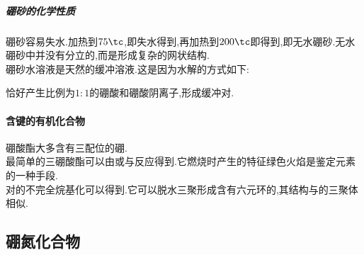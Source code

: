 \documentclass{ctexart}
\begin{document}
\subparagraph{硼砂的化学性质}
硼砂容易失水.加热到$75\tc$,即失水得到,再加热到$200\tc$即得到,即无水硼砂.无水硼砂中并没有分立的,而是形成复杂的网状结构.\\
\indent 硼砂水溶液是天然的缓冲溶液.这是因为水解的方式如下:
\begin{center}
\end{center}
恰好产生比例为$1:1$的硼酸和硼酸阴离子,形成缓冲对.
\paragraph{含键的有机化合物}
硼酸酯大多含有三配位的硼.\\
\indent 最简单的三硼酸酯可以由或与反应得到.它燃烧时产生的特征绿色火焰是鉴定元素的一种手段.\\
\indent 对的不完全烷基化可以得到.它可以脱水三聚形成含有六元环的,其结构与的三聚体相似.
\subsection{硼氮化合物}
\end{document}
